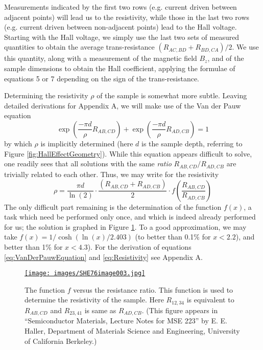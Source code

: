 \documentclass{../lab}
\begin{document}
Measurements indicated by the first two rows (e.g. current driven between adjacent points) will lead us to the resistivity, while those in the last two rows (e.g. current driven between non-adjacent points) lead to the Hall voltage. Starting with the Hall voltage, we simply use the last two sets of measured quantities to obtain the average trans-resistance $(R_{AC,BD} + R_{BD,CA})/2$. We use this quantity, along with a measurement of the magnetic field $B_z$, and of the sample dimensions to obtain the Hall coefficient, applying the formulae of equations 5 or 7 depending on the sign of the trans-resistance.

Determining the resistivity $\rho$ of the sample is somewhat more subtle. Leaving detailed derivations for Appendix A, we will make use of the Van der Pauw equation
\begin{equation}
\label{eq:VanDerPauwEquation}
    \exp \left(\frac{-\pi d}{\rho} R_{AB,CD} \right) + \exp \left(\frac{-\pi d}{\rho} R_{AD,CB} \right) = 1
\end{equation}
by which $\rho$ is implicitly determined (here $d$ is the sample depth, referring to Figure \ref{fig:HallEffectGeometry}). While this equation appears difficult to solve, one readily sees that all solutions with the same \emph{ratio} $R_{AB,CD} / R_{AD,CB}$ are trivially related to each other. Thus, we may write for the resistivity
\begin{equation}
\label{eq:Resistivity}
    \rho = \frac{\pi d}{\ln(2)} \cdot \frac{(R_{AB,CD}+R_{AD,CB})}{2} \cdot f \left( \frac{R_{AB,CD}}{R_{AD,CB}} \right)
\end{equation}
The only difficult part remaining is the determination of the function $f(x)$, a task which need be performed only once, and which is indeed already performed for us; the solution is graphed in Figure \ref{fig:FVersusResistanceRatio}. To a good approximation, we may take $f(x) = 1/\cosh(\ln(x)/2.403)$ (to better than 0.1\% for $x < 2.2$), and better than 1\% for $x < 4.3$). For the derivation of equations \eqref{eq:VanDerPauwEquation} and \eqref{eq:Resistivity} see Appendix A.

\begin{figure}[h]
    \centering
    \href{http://experimentationlab.berkeley.edu/sites/default/files/images/SHE76image003.jpg}{\texttt{[image: images/SHE76image003.jpg]}}
    \caption{The function $f$ versus the resistance ratio. This function is used to determine the resistivity of the sample. Here $R_{12,34}$ is equivalent to $R_{AB,CD}$ and $R_{23,41}$ is same as $R_{AD,CB}$. (This figure appears in ``Semiconductor Materials, Lecture Notes for MSE 223'' by E. E. Haller, Department of Materials Science and Engineering, University of California Berkeley.)}
    \label{fig:FVersusResistanceRatio}
\end{figure}
\end{document}
